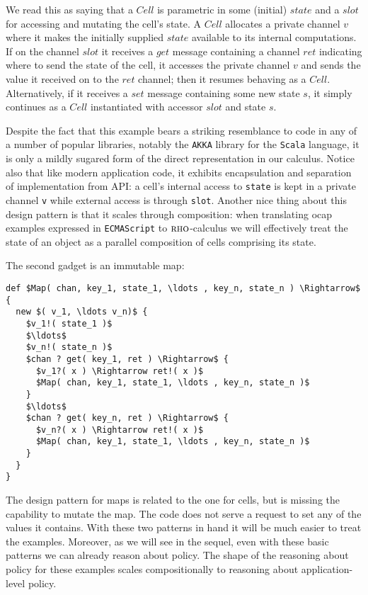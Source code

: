 \documentclass[]{acm_proc_article-sp}
\numberwithin{equation}{subsection}
\newcommand{\rhoc}{${\textsc{rho}}$-calculus}
\begin{document}
We read this as saying that a $Cell$ is parametric in some (initial)
$state$ and a $slot$ for accessing and mutating the cell's state. A
$Cell$ allocates a private channel $v$ where it makes the initially
supplied $state$ available to its internal computations. If on the
channel $slot$ it receives a $get$ message containing a channel $ret$
indicating where to send the state of the cell, it accesses the
private channel $v$ and sends the value it received on to the $ret$
channel; then it resumes behaving as a $Cell$. Alternatively, if it
receives a $set$ message containing some new state $s$, it simply
continues as a $Cell$ instantiated with accessor $slot$ and state $s$.

Despite the fact that this example bears a striking resemblance to code
in any of a number of popular libraries, notably the {\tt AKKA}
library for the {\tt Scala} language, it is only a mildly sugared
form of the direct representation in our calculus. Notice also that
like modern application code, it exhibits encapsulation and separation
of implementation from API: a cell's internal access to
{\tt state} is kept in a private channel {\tt v} while
external access is through {\tt slot}. Another nice thing about
this design pattern is that it scales through composition: when
translating ocap examples expressed in {\tt ECMAScript} to \rhoc\;
we will effectively treat the state of an object as a parallel
composition of cells comprising its state.

The second gadget is an immutable map:

\pagebreak

\begin{lstlisting}[mathescape]
def $Map( chan, key_1, state_1, \ldots , key_n, state_n ) \Rightarrow$ {
  new $( v_1, \ldots v_n)$ {
    $v_1!( state_1 )$
    $\ldots$
    $v_n!( state_n )$
    $chan ? get( key_1, ret ) \Rightarrow$ { 
      $v_1?( x ) \Rightarrow ret!( x )$
      $Map( chan, key_1, state_1, \ldots , key_n, state_n )$
    }
    $\ldots$
    $chan ? get( key_n, ret ) \Rightarrow$ { 
      $v_n?( x ) \Rightarrow ret!( x )$
      $Map( chan, key_1, state_1, \ldots , key_n, state_n )$
    }
  }
}
\end{lstlisting}

The design pattern for maps is related to the one for cells, but is
missing the capability to mutate the map. The code does not serve a
request to set any of the values it contains. With these two patterns
in hand it will be much easier to treat the examples. Moreover, as we
will see in the sequel, even with these basic patterns we can already
reason about policy.  The shape of the reasoning about policy for these
examples scales compositionally to reasoning about application-level
policy.
\end{document}
